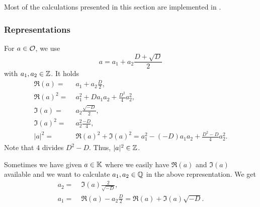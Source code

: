 Most of the calculations presented in this section are implemented in .

\subsubsection{Representations}

\label{impl:repr:curlO}

For $a \in \mathcal{O}$, we use
\[ a = a_1 + a_2 \frac{D + \sqrt{D}} {2} \]
with $a_1,a_2 \in \mathbb{Z}$.
It holds
\begin{align*}
\Re(a) = &\; a_1 + a_2 \frac{D}{2} , \\
\Re(a)^2 =&\; a_1^2 + D a_1 a_2 + \frac{D^2}{4} a_2^2 , \\
\Im(a) =&\; a_2 \frac{\sqrt{-D}}{2} , \\
\Im(a)^2 =&\; a_2^2 \frac{-D}{4} , \\
|a|^2 =&\; \Re(a)^2 + \Im(a)^2 = a_1^2 - (-D) a_1 a_2 + \frac{D^2-D}{4} a_2^2 .
\end{align*}
Note that $4$ divides $D^2 - D$. Thus, $|a|^2 \in \mathbb{Z}$.

Sometimes we have given $a \in \mathbb{K}$ where we easily have $\Re(a)$ and $\Im(a)$ available and we want to calculate $a_1, a_2 \in \mathbb{Q}$ in the above representation. We get
\begin{align*}
a_2 = &\; \Im(a) \frac{2}{\sqrt{-D}}, \\
a_1 = &\; \Re(a) - a_2 \frac{D}{2} = \Re(a) + \Im(a) \sqrt{-D} .
\end{align*}

\label{impl:repr:curlOdual}

